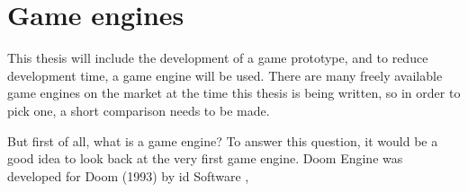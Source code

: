 \section{Game engines}

This thesis will include the development of a game prototype, and to reduce development time, a game engine will be used. There are many freely available game engines on the market at the time this thesis is being written, so in order to pick one, a short comparison needs to be made.

But first of all, what is a game engine? To answer this question, it would be a good idea to look back at the very first game engine. Doom Engine was developed for Doom (1993) by id Software , 